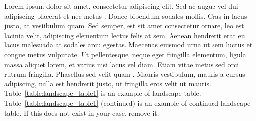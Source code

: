 Lorem ipsum dolor sit amet, consectetur adipiscing elit. Sed ac augue vel dui 
adipiscing placerat et nec metus \cite{Wolchik2000843}. 
Donec bibendum sodales mollis. Cras in lacus 
justo, at vestibulum quam. Sed semper, est sit amet consectetur ornare, leo est 
lacinia velit, adipiscing elementum lectus felis at sem. Aenean hendrerit erat eu 
lacus malesuada at sodales arcu egestas. Maecenas euismod urna ut sem luctus et 
congue metus vulputate. Ut pellentesque, neque eget fringilla elementum, ligula 
massa aliquet lorem, et varius nisi lacus vel diam. Etiam vitae metus sed orci 
rutrum fringilla. Phasellus sed velit quam \cite{Zuckerman199486}. 
Mauris vestibulum, mauris a cursus 
adipiscing, nulla est hendrerit justo, ut fringilla eros velit ut mauris. Table~\ref{table:landscape_table1} is an example of landscape table. Table~\ref{table:landscape_table1} (continued) is an example of continued landscape table. If this does not exist in your case, remove it.

